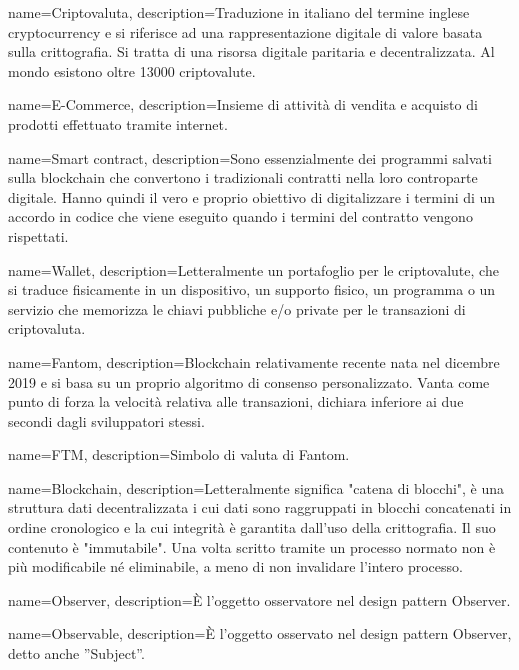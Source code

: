 {
  name={Criptovaluta},
  description={Traduzione in italiano del termine inglese cryptocurrency e si riferisce ad una rappresentazione digitale di valore basata sulla crittografia. Si tratta di una risorsa digitale paritaria e decentralizzata. Al mondo esistono oltre 13000 criptovalute.}
}

{
  name={E-Commerce},
  description={Insieme di attività di vendita e acquisto di prodotti effettuato tramite internet.}
}

{
  name={Smart contract},
  description={Sono essenzialmente dei programmi salvati sulla blockchain che convertono i tradizionali contratti nella loro controparte digitale. Hanno quindi il vero e proprio obiettivo di digitalizzare i termini di un accordo in codice che viene eseguito quando i termini del contratto vengono rispettati.}
}

{
  name={Wallet},
  description={Letteralmente un portafoglio per le criptovalute, che si traduce fisicamente in un dispositivo, un supporto fisico, un programma o un servizio che memorizza le chiavi pubbliche e/o private per le transazioni di criptovaluta.}
}

{
  name={Fantom},
  description={Blockchain relativamente recente nata nel dicembre 2019 e si basa su un proprio algoritmo di consenso personalizzato. Vanta come punto di forza la velocità relativa alle transazioni, dichiara inferiore ai due secondi dagli sviluppatori stessi.}
}

{
  name={FTM},
  description={Simbolo di valuta di Fantom.}
}

{
  name={Blockchain},
  description={Letteralmente significa "catena di blocchi", è una struttura dati decentralizzata i cui dati sono raggruppati in blocchi concatenati in ordine cronologico e la cui integrità è garantita dall'uso della crittografia. Il suo contenuto è "immutabile". Una volta scritto tramite un processo normato non è più modificabile né eliminabile, a meno di non invalidare l'intero processo.}
}

{
  name={Observer},
  description={È l’oggetto osservatore nel design pattern Observer\glo.}
}

{
  name={Observable},
  description={È l’oggetto osservato nel design pattern Observer\glo, detto anche ”Subject”.}
}


